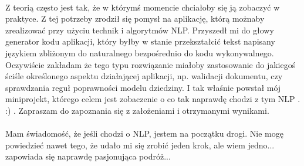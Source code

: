 \paragraph{}
Z teorią często jest tak, że w którymś momencie chciałoby się ją zobaczyć w praktyce. Z tej potrzeby zrodził się pomysł na aplikację, którą możnaby
zrealizować przy użyciu technik i algorytmów NLP.
\newline
Przyszedł mi do głowy generator kodu aplikacji, który byłby w stanie przekształcić tekst napisany językiem zbliżonym do naturalnego bezpośrednio do kodu wykonywalnego.  Oczywiście zakładam że tego typu rozwiązanie miałoby zastosowanie do jakiegoś ściśle określonego aspektu działającej aplikacji, np. walidacji dokumentu, czy sprawdzania reguł poprawności modelu dziedziny.  
\newline
I tak właśnie powstał mój miniprojekt, którego celem jest zobaczenie o co tak naprawdę chodzi z tym NLP . :) . Zapraszam do zapoznania się z założeniami i otrzymanymi wynikami.
\paragraph{}
Mam świadomość, że jeśli chodzi o NLP, jestem na początku drogi. Nie mogę powiedzieć nawet tego, że udało mi się zrobić jeden krok, ale wiem jedno...
zapowiada się naprawdę pasjonująca podróż...